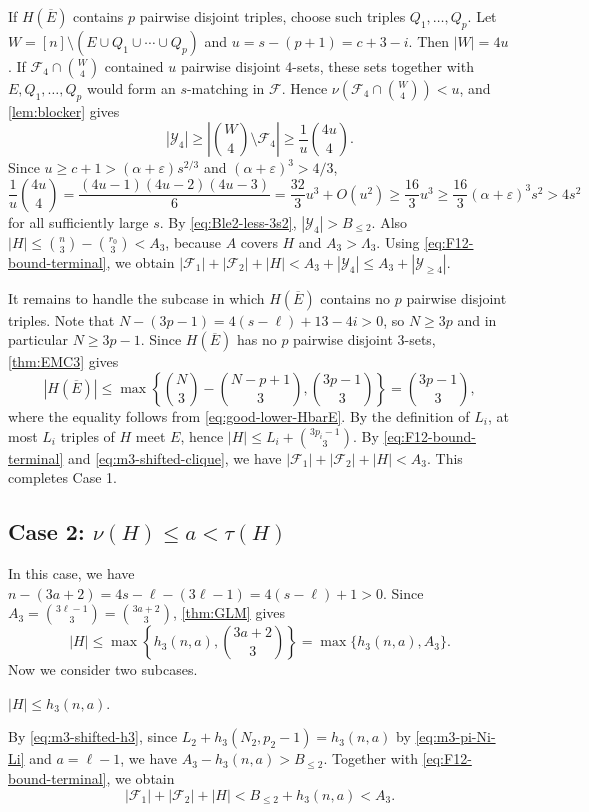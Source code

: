 \documentclass[10pt,a4paper]{article}
\numberwithin{equation}{section}
\theoremstyle{definition}
\newcommand{\F}{\mathcal F}
\newcommand{\Y}{\mathcal Y}
\begin{document}
If $H(\overline E)$ contains $p$ pairwise disjoint triples, choose such triples $Q_1,\ldots,Q_p$.
Let $W=[n]\setminus(E\cup Q_1\cup\cdots\cup Q_p)$ and $u=s-(p+1)=c+3-i$.
Then $|W|=4u$.
If $\F_4\cap\binom W4$ contained $u$ pairwise disjoint $4$-sets, these sets together with $E,Q_1,\ldots,Q_p$ would form an $s$-matching in $\F$.
Hence $\nu(\F_4\cap\binom W4)<u$, and \cref{lem:blocker} gives
\[
        |\Y_4|\ge \left|\binom W4\setminus\F_4\right|
        \ge \frac1u\binom{4u}{4}.
\]
Since $u\ge c+1>(\alpha+\varepsilon)s^{2/3}$ and $(\alpha+\varepsilon)^3>4/3$,
\[
        \frac1u\binom{4u}{4}
        =\frac{(4u-1)(4u-2)(4u-3)}6
        =\frac{32}{3}u^3+O(u^2)
        \ge \frac{16}{3}u^3
        \ge \frac{16}{3}(\alpha+\varepsilon)^3s^2
        >4s^2
\]
for all sufficiently large $s$.
By \eqref{eq:Ble2-less-3s2}, $|\Y_4|>B_{\le2}$.
Also $|H|\le\binom n3-\binom{r_0}{3}<A_3$, because $A$ covers $H$ and $A_3>\Lambda_3$.
Using \eqref{eq:F12-bound-terminal}, we obtain $|\F_1|+|\F_2|+|H|<A_3+|\Y_4|\le A_3+|\Y_{\ge4}|$.

It remains to handle the subcase in which $H(\overline E)$ contains no $p$ pairwise disjoint triples.
Note that $N-(3p-1)=4(s-\ell)+13-4i>0$, so $N\ge3p$ and in particular $N\ge3p-1$.
Since $H(\overline E)$ has no $p$ pairwise disjoint $3$-sets, \cref{thm:EMC3} gives
\[
        |H(\overline E)|\le
        \max\left\{\binom N3-\binom{N-p+1}{3},\binom{3p-1}{3}\right\}=\binom{3p-1}{3},
\]
where the equality follows from \eqref{eq:good-lower-HbarE}.
By the definition of $L_i$, at most $L_i$ triples of $H$ meet $E$, hence $|H|\le L_i+\binom{3p_i-1}{3}$.
By \eqref{eq:F12-bound-terminal} and \eqref{eq:m3-shifted-clique}, we have $|\F_1|+|\F_2|+|H|<A_3$.
This completes Case 1.


\subsection{Case 2: $\nu(H)\le a<\tau(H)$}



In this case, we have $n-(3a+2)=4s-\ell-(3\ell-1)=4(s-\ell)+1>0$.
Since $A_3=\binom{3\ell-1}{3}=\binom{3a+2}{3}$, \cref{thm:GLM} gives
\[
        |H|\le\max\left\{h_3(n,a),\binom{3a+2}{3}\right\}=\max\{h_3(n,a),A_3\}.
\]
Now we consider two subcases.

\medskip
{} $|H|\le h_3(n,a)$.
\medskip

By \eqref{eq:m3-shifted-h3}, since $L_2+h_3(N_2,p_2-1)=h_3(n,a)$ by \eqref{eq:m3-pi-Ni-Li} and $a=\ell-1$, we have $A_3-h_3(n,a)>B_{\le2}$.
Together with \eqref{eq:F12-bound-terminal}, we obtain
\[
        |\F_1|+|\F_2|+|H|<B_{\le2}+h_3(n,a)<A_3.
\]
\end{document}

